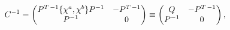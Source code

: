 \begin{equation}
C\sp{-1}=\left(\begin{matrix} P\sp{T\, -1} \{\chi^a,\chi^b\} P\sp{-1}&-P\sp{T\,
-1}\\ P\sp{-1} &0 \end{matrix}\right)
 \equiv
\left(\begin{matrix} Q&-P\sp{T\,-1}\\ P\sp{-1} &0
  \end{matrix}\right),
\label{matC}
\end{equation}

